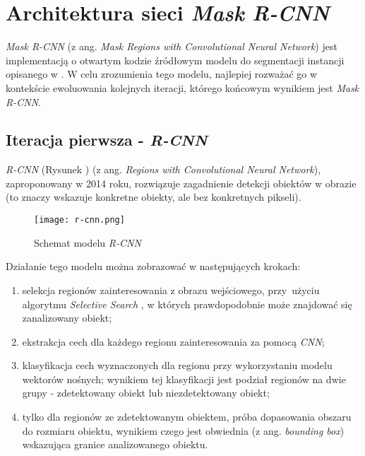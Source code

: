 \section{Architektura sieci \textit{Mask R-CNN}}
\label{sec:architekrura_mask_rcnn}

\textit{Mask R-CNN} \cite{matterport-mask-rcnn} (z ang. \textit{Mask Regions with Convolutional Neural Network}) jest implementacją o otwartym kodzie źródłowym modelu do segmentacji instancji opisanego w \cite{general-mask-rcnn}.
W celu zrozumienia tego modelu, najlepiej rozważać go w kontekście ewoluowania kolejnych iteracji, którego końcowym wynikiem jest \textit{Mask R-CNN}.

\subsection{Iteracja pierwsza - \textit{R-CNN}}

\textit{R-CNN} \cite{rcnn} (Rysunek ) (z ang. \textit{Regions with Convolutional Neural Network}), zaproponowany w 2014 roku, rozwiązuje zagadnienie detekcji obiektów w obrazie (to znaczy wskazuje konkretne obiekty, ale bez konkretnych pikseli).

\begin{figure}[h]
  \centering
  \texttt{[image: r-cnn.png]}
  \caption{Schemat modelu \textit{R-CNN}}
  \label{fig:r_cnn}
\end{figure}

Działanie tego modelu można zobrazować w następujących krokach:
\label{sec:regiony}
\begin{enumerate}
  \item selekcja regionów zainteresowania z obrazu wejściowego, przy~użyciu algorytmu \textit{Selective Search} \cite{selective-search}, w których prawdopodobnie może znajdować się zanalizowany obiekt;
  \item ekstrakcja cech dla każdego regionu zainteresowania za pomocą \textit{CNN};
  \item klasyfikacja cech wyznaczonych dla regionu przy wykorzystaniu modelu wektorów nośnych; wynikiem tej klasyfikacji jest podział regionów na dwie grupy - zdetektowany obiekt lub niezdetektowany obiekt;
  \item tylko dla regionów ze zdetektowanym obiektem, próba dopasowania obszaru do rozmiaru obiektu, wynikiem czego jest obwiednia (z ang. \textit{bounding box}) wskazująca granice analizowanego obiektu.
\end{enumerate}

